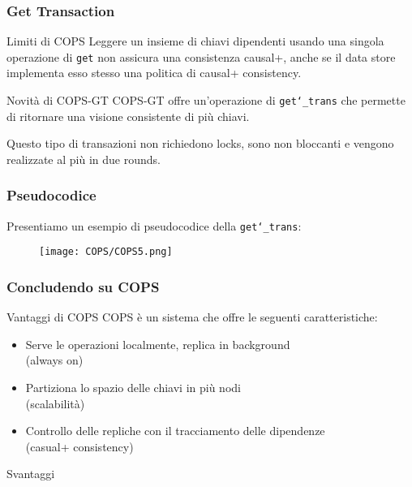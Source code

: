 \begin{frame}
\frametitle{Get Transaction}
\begin{block}{Limiti di COPS}
Leggere un insieme di chiavi dipendenti usando una singola operazione di \texttt{get}
non assicura una consistenza causal+, anche se il data store implementa esso stesso
una politica di causal+ consistency.
\end{block}
\begin{block}{Novità di COPS-GT}
COPS-GT offre un'operazione di \texttt{get\char`_trans} che permette di
ritornare una visione consistente di più chiavi.
\end{block}
Questo tipo di transazioni non richiedono locks, sono non bloccanti e
vengono realizzate al più in due rounds.
\end{frame}

\begin{frame}
\frametitle{Pseudocodice}
Presentiamo un esempio di pseudocodice della \texttt{get\char`_trans}:
\begin{figure}
	\centering
	\texttt{[image: COPS/COPS5.png]}
\end{figure}
\end{frame}

\begin{frame}
\frametitle{Concludendo su COPS}
\begin{block}{Vantaggi di COPS}
COPS è un sistema che offre le seguenti caratteristiche:
	\begin{itemize}
		\item<1-> Serve le operazioni localmente, replica in background \\
				  (always on)
		\item<1-> Partiziona lo spazio delle chiavi in più nodi \\
				  (scalabilità)
		\item<1-> Controllo delle repliche con il tracciamento delle dipendenze \\
				  (casual+ consistency)
	\end{itemize}
\end{block}
\begin{block}{Svantaggi}
\end{block}
\end{frame}
